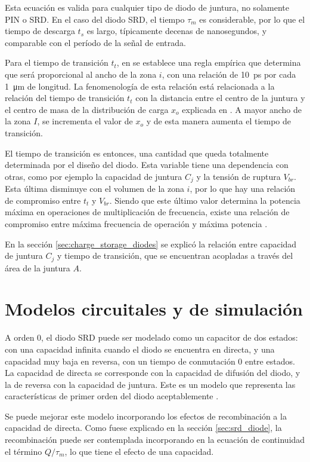 Esta ecuación es valida para cualquier tipo de diodo de juntura, no solamente
PIN o SRD. En el caso del diodo SRD, el tiempo $\tau_m$ es considerable, por lo
que el tiempo de descarga $t_s$ es largo, típicamente decenas de nanosegundos, y comparable con el período de la señal de entrada.

Para el tiempo de transición $t_t$, en \cite{moll1969} se establece una regla
empírica que determina que será proporcional al ancho de la zona $i$, con una
relación de \qty{10}{\pico\second} por cada \qty{1}{\micro\meter} de longitud.
La fenomenología de esta relación está relacionada a la relación del tiempo de
transición $t_t$ con la distancia entre el centro de la juntura y el centro de
masa de la distribución de carga $x_o$ explicada en \cite{moll1962}. A mayor
ancho de la zona $I$, se incrementa el valor de $x_o$ y de esta manera aumenta
el tiempo de transición.

El tiempo de transición es entonces, una cantidad que queda totalmente
determinada por el diseño del diodo. Esta variable tiene una dependencia con
otras, como por ejemplo la capacidad de juntura $C_j$ y la tensión de ruptura
$V_{br}$. Esta última disminuye con el volumen de la zona $i$, por lo que hay
una relación de compromiso entre $t_t$ y $V_{br}$. Siendo que este último valor
determina la potencia máxima en operaciones de multiplicación de frecuencia,
existe una relación de compromiso entre máxima frecuencia de operación y máxima
potencia \cite{moll1969}.

En la sección \ref{sec:charge_storage_diodes} se explicó la relación entre
capacidad de juntura $C_j$ y tiempo de transición, que se encuentran acopladas a
través del área de la juntura $A$.

\section{Modelos circuitales y de simulación}
\label{sec:srd_simulation_models}

A orden 0, el diodo SRD puede ser modelado como un capacitor de dos estados: con
una capacidad infinita cuando el diodo se encuentra en directa, y una capacidad
muy baja en reversa, con un tiempo de conmutación 0 entre estados. La capacidad
de directa se corresponde con la capacidad de difusión del diodo, y la de
reversa con la capacidad de juntura. Este es un modelo que representa las
características de primer orden del diodo aceptablemente \cite{moll1969}.

Se puede mejorar este modelo incorporando los efectos de recombinación a la
capacidad de directa. Como fuese explicado en la sección \ref{sec:srd_diode}, la
recombinación puede ser contemplada incorporando en la ecuación de continuidad
el término $Q/\tau_m$, lo que tiene el efecto de una capacidad.

